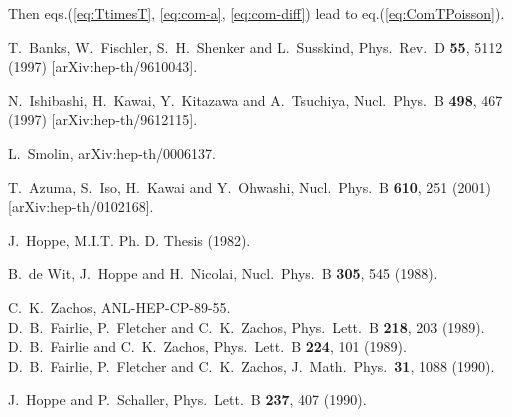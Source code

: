 \documentclass[a4paper,12pt]{article}
\begin{document}
Then eqs.(\ref{eq:TtimesT}, \ref{eq:com-a}, \ref{eq:com-diff}) lead to
eq.(\ref{eq:ComTPoisson}).
\begin{thebibliography}{99}
	T.~Banks, W.~Fischler, S.~H.~Shenker and L.~Susskind,
	Phys.\ Rev.\ D {\bf 55}, 5112 (1997)
	[arXiv:hep-th/9610043].

	N.~Ishibashi, H.~Kawai, Y.~Kitazawa and A.~Tsuchiya,
	Nucl.\ Phys.\ B {\bf 498}, 467 (1997)
	[arXiv:hep-th/9612115].

	L.~Smolin,
	arXiv:hep-th/0006137.

	T.~Azuma, S.~Iso, H.~Kawai and Y.~Ohwashi,
	Nucl.\ Phys.\ B {\bf 610}, 251 (2001)
	[arXiv:hep-th/0102168].

	 J.~Hoppe, M.I.T. Ph. D. Thesis (1982).

	B.~de Wit, J.~Hoppe and H.~Nicolai,
	Nucl.\ Phys.\ B {\bf 305}, 545 (1988).

	C.~K.~Zachos,
	ANL-HEP-CP-89-55.\\
	D.~B.~Fairlie, P.~Fletcher and C.~K.~Zachos,
	Phys.\ Lett.\ B {\bf 218}, 203 (1989).
	\\ %
	D.~B.~Fairlie and C.~K.~Zachos,
	Phys.\ Lett.\ B {\bf 224}, 101 (1989).
	\\ %
	D.~B.~Fairlie, P.~Fletcher and C.~K.~Zachos,
	J.\ Math.\ Phys.\  {\bf 31}, 1088 (1990).

	J.~Hoppe and P.~Schaller,
	Phys.\ Lett.\ B {\bf 237}, 407 (1990).


\end{thebibliography}
\end{document}
